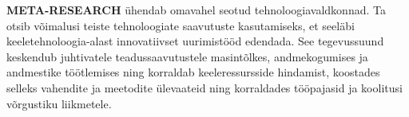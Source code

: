 \begin{multicols}{2}
\textbf{META-RESEARCH} ühendab omavahel seotud tehnoloogiavaldkonnad. Ta otsib võimalusi teiste tehnoloogiate saavutuste kasutamiseks, et seeläbi keeletehnoloogia-alast innovatiivset uurimistööd edendada. See tegevussuund keskendub juhtivatele teadussaavutustele masintõlkes, andmekogumises ja andmestike töötlemises ning korraldab keeleressursside hindamist, koostades selleks vahendite ja meetodite ülevaateid ning korraldades tööpajasid ja koolitusi võrgustiku liikmetele. 

\end{multicols}



\cleardoublepage



